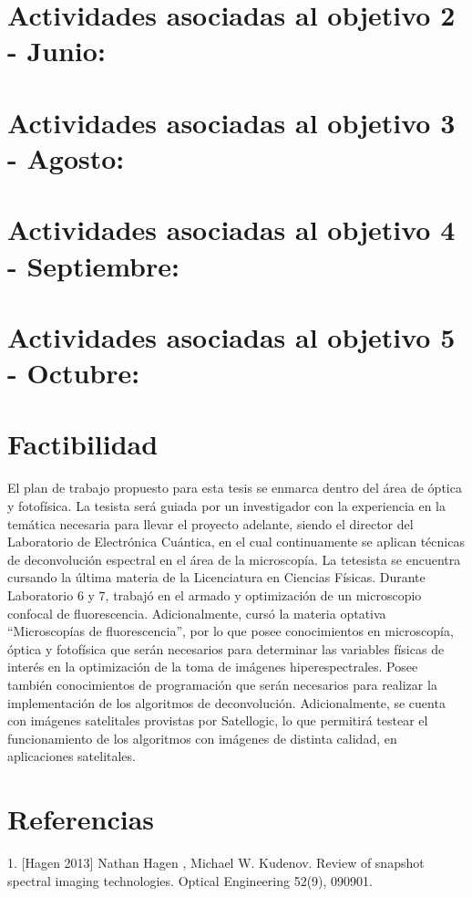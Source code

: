 \documentclass{ctuthesis}
\begin{document}
\section*{Actividades asociadas al objetivo 2 - Junio:}
\section*{Actividades asociadas al objetivo 3 - Agosto:}
\section*{Actividades asociadas al objetivo 4 - Septiembre:}
\section*{Actividades asociadas al objetivo 5 - Octubre:}
\section*{Factibilidad}
El plan de trabajo propuesto para esta tesis se enmarca dentro del área de óptica y fotofísica. La tesista será guiada por un investigador con la experiencia en la temática necesaria para llevar el proyecto adelante, siendo el director del Laboratorio de Electrónica Cuántica, en el cual continuamente se aplican técnicas de deconvolución espectral en el área de la microscopía.
La tetesista se encuentra cursando la última materia de la Licenciatura en Ciencias Físicas. Durante Laboratorio 6 y 7, trabajó en el armado y optimización de un microscopio confocal de fluorescencia. Adicionalmente, cursó la materia optativa “Microscopías de fluorescencia”, por lo que posee conocimientos en microscopía, óptica y fotofísica que serán necesarios para determinar las variables físicas de interés en la optimización de la toma de imágenes hiperespectrales. Posee también conocimientos de programación que serán necesarios para realizar la implementación de los algoritmos de deconvolución.
Adicionalmente, se cuenta con imágenes satelitales provistas por Satellogic, lo que permitirá testear el funcionamiento de los algoritmos con imágenes de distinta calidad, en aplicaciones satelitales. 
\section*{Referencias}
1. [Hagen 2013] Nathan Hagen , Michael W. Kudenov. Review of snapshot spectral imaging technologies. Optical Engineering 52(9), 090901.
\end{document}
